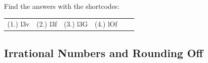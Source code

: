   \label{m38348**end}
\par {} Find the answers with the shortcodes:
 \par \begin{tabular}[h]{cccccc}
 (1.) l3v  &  (2.) l3f  &  (3.) l3G  &  (4.) lOf  & \end{tabular}
\subsection{Irrational Numbers and Rounding Off}
            \nopagebreak

